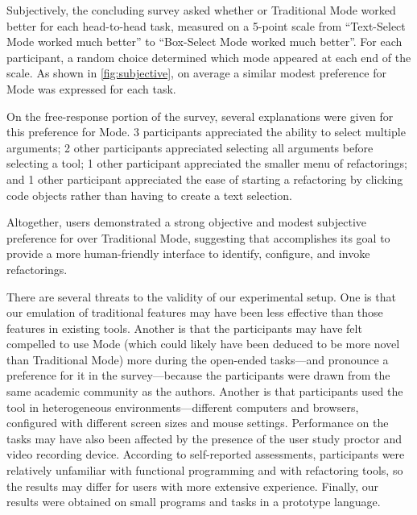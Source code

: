 



Subjectively, the concluding survey asked whether \deuce{} or Traditional Mode worked better for
each head-to-head task, measured on a 5-point scale from ``Text-Select Mode worked much better'' to
``Box-Select Mode worked much better''. For each participant, a random choice
determined which mode appeared at each end of the scale.
As shown in \autoref{fig:subjective}, on average a similar
modest preference for \deuce{} Mode was expressed for each task.



On the free-response portion of the survey, several explanations were given for this
preference for \deuce{} Mode.
3 participants
appreciated the ability to select multiple arguments;
2 other participants
appreciated selecting all arguments before selecting a tool;
1 other participant
appreciated the smaller menu of refactorings; and
1 other participant
appreciated the ease of starting a refactoring by clicking code objects rather
than having to create a text selection.

Altogether, users demonstrated a strong objective and modest subjective preference for
\deuce{} over Traditional Mode, suggesting that \deuce{} accomplishes its goal
to provide a more human-friendly interface to identify, configure, and invoke refactorings.


There are several threats to the validity of our experimental setup.
One is that our emulation of traditional features may have been less
effective than those features in existing tools. Another is that
the participants may have felt compelled to use \deuce{} Mode (which could
likely have been deduced to be more novel than Traditional Mode) more during the
open-ended tasks---and pronounce a preference for it in the survey---because the
participants were drawn from the same academic community as the authors. Another
is that participants used the tool in heterogeneous environments---different
computers and browsers, configured with different screen sizes and mouse
settings. Performance on the tasks may have also been affected by the presence
of the user study proctor and video recording device. According
to self-reported assessments, participants were relatively unfamiliar with
functional programming and with refactoring tools, so the results may differ
for users with more extensive experience. Finally, our results were obtained on
small programs and tasks in a prototype language.

